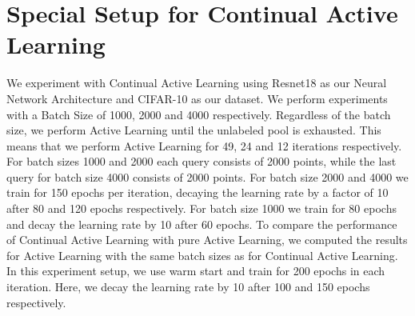 \section{Special Setup for Continual Active Learning}
\label{sec:Methodology:CALsetup}
We experiment with Continual Active Learning using Resnet18 as our Neural Network Architecture and CIFAR-10 as our dataset. We perform experiments with a Batch Size of 1000,
2000 and 4000 respectively. Regardless of the batch size, we perform Active Learning until the unlabeled pool is exhausted. This means that we perform Active Learning for
49, 24 and 12 iterations respectively. For batch sizes 1000 and 2000 each query consists of 2000 points, while the last query for batch size 4000 consists of 2000 points.
For batch size 2000 and 4000 we train for 150 epochs per iteration, decaying the learning rate by a factor of 10 after 80 and 120 epochs respectively. For batch size 1000 we
train for 80 epochs and decay the learning rate by 10 after 60 epochs. To compare the performance of Continual Active Learning with pure Active Learning, we computed the results
for Active Learning with the same batch sizes as for Continual Active Learning. In this experiment setup, we use warm start and train for 200 epochs in each iteration. Here, we
decay the learning rate by 10 after 100 and 150 epochs respectively.

